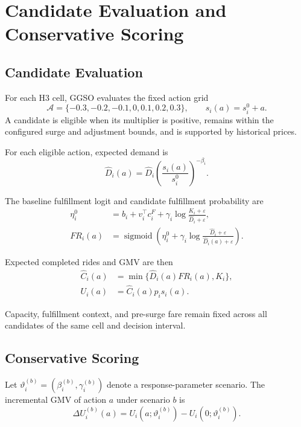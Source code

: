 \documentclass[a4paper,10pt,twocolumn]{article}
\newcommand{\sigmoid}{\operatorname{sigmoid}}
\begin{document}
\section{Candidate Evaluation and Conservative Scoring}\label{app:candidate}
\subsection{Candidate Evaluation}
For each H3 cell, GGSO evaluates the fixed action grid
\begin{equation}
\mathcal A=\{-0.3,-0.2,-0.1,0,0.1,0.2,0.3\},
\qquad
s_i(a)=s_i^0+a.
\label{eq:grid}
\end{equation}
A candidate is eligible when its multiplier is positive, remains within
the configured surge and adjustment bounds, and is supported by historical
prices.

For each eligible action, expected demand is
\begin{equation}
\widehat D_i(a)
=
\widehat D_i
\left(\frac{s_i(a)}{s_i^0}\right)^{-\beta_i}.
\end{equation}

The baseline fulfillment logit and candidate fulfillment probability are
\begin{equation}
\begin{aligned}
\eta_i^0
&=
b_i+v_i^\top c_i^F+
\gamma_i\log
\frac{K_i+\varepsilon}{\widehat D_i+\varepsilon},\\
FR_i(a)
&=
\sigmoid\left(
\eta_i^0+
\gamma_i\log
\frac{\widehat D_i+\varepsilon}
     {\widehat D_i(a)+\varepsilon}
\right).
\end{aligned}
\end{equation}

Expected completed rides and GMV are then
\begin{equation}
\begin{aligned}
\widehat C_i(a)
&=
\min\{\widehat D_i(a)FR_i(a),K_i\},\\
U_i(a)
&=
\widehat C_i(a)p_i s_i(a).
\end{aligned}
\end{equation}

Capacity, fulfillment context, and pre-surge fare remain fixed across all
candidates of the same cell and decision interval.

\subsection{Conservative Scoring}
Let $\vartheta_i^{(b)}=(\beta_i^{(b)},\gamma_i^{(b)})$ denote a
response-parameter scenario. The incremental GMV of action $a$ under
scenario $b$ is
\begin{equation}
\Delta U_i^{(b)}(a)
=
U_i(a;\vartheta_i^{(b)})
-
U_i(0;\vartheta_i^{(b)}).
\end{equation}
\end{document}
